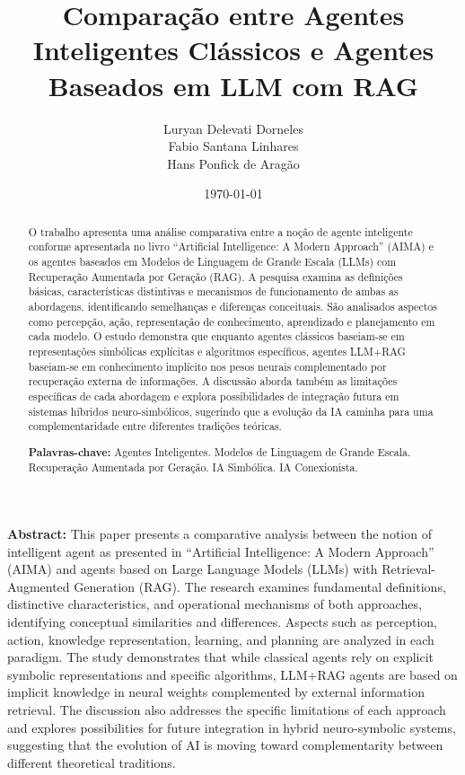 \documentclass[12pt]{article}
\title{Comparação entre Agentes Inteligentes Clássicos e Agentes Baseados em LLM com RAG}
\author{Luryan Delevati Dorneles \\ Fabio Santana Linhares \\ Hans Ponfick de Aragão}
\date{\today}
\begin{document}
\maketitle

\begin{abstract}
O trabalho apresenta uma análise comparativa entre a noção de agente inteligente conforme apresentada no livro ``Artificial Intelligence: A Modern Approach'' (AIMA) e os agentes baseados em Modelos de Linguagem de Grande Escala (LLMs) com Recuperação Aumentada por Geração (RAG). A pesquisa examina as definições básicas, características distintivas e mecanismos de funcionamento de ambas as abordagens, identificando semelhanças e diferenças conceituais. São analisados aspectos como percepção, ação, representação de conhecimento, aprendizado e planejamento em cada modelo. O estudo demonstra que enquanto agentes clássicos baseiam-se em representações simbólicas explícitas e algoritmos específicos, agentes LLM+RAG baseiam-se em conhecimento implícito nos pesos neurais complementado por recuperação externa de informações. A discussão aborda também as limitações específicas de cada abordagem e explora possibilidades de integração futura em sistemas híbridos neuro-simbólicos, sugerindo que a evolução da IA caminha para uma complementaridade entre diferentes tradições teóricas.

\bigskip
\noindent
\textbf{Palavras-chave:} Agentes Inteligentes. Modelos de Linguagem de Grande Escala. Recuperação Aumentada por Geração. IA Simbólica. IA Conexionista.
\end{abstract}

\bigskip

\bigskip

\noindent\textbf{Abstract:} 
This paper presents a comparative analysis between the notion of intelligent agent as presented in ``Artificial Intelligence: A Modern Approach'' (AIMA) and agents based on Large Language Models (LLMs) with Retrieval-Augmented Generation (RAG). The research examines fundamental definitions, distinctive characteristics, and operational mechanisms of both approaches, identifying conceptual similarities and differences. Aspects such as perception, action, knowledge representation, learning, and planning are analyzed in each paradigm. The study demonstrates that while classical agents rely on explicit symbolic representations and specific algorithms, LLM+RAG agents are based on implicit knowledge in neural weights complemented by external information retrieval. The discussion also addresses the specific limitations of each approach and explores possibilities for future integration in hybrid neuro-symbolic systems, suggesting that the evolution of AI is moving toward complementarity between different theoretical traditions.
\end{document}
